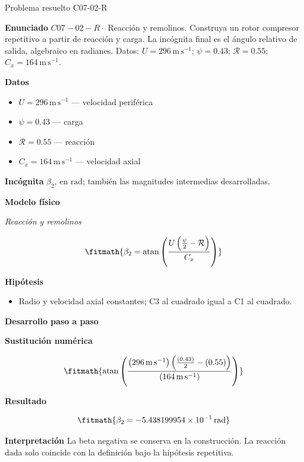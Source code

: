 \documentclass[10pt,openany]{book}
\begin{document}
\begin{studiumworked}{Problema resuelto C07-02-R}


\noindent\textbf{Enunciado}
\(C07-02-R \cdot\) Reacción y remolinos. Construya un rotor compresor repetitivo a partir de reacción y carga. La incógnita final es el ángulo relativo de salida, algebraico en radianes. Datos: \(U=296\, \mathrm{m}\,\mathrm{s}^{-1}\); \(\psi=0.43\); \(\mathcal R=0.55\); \(C_x=164\, \mathrm{m}\,\mathrm{s}^{-1}\).

\noindent\textbf{Datos}
\begin{itemize}
\item $U = 296\,\mathrm{m}\,\mathrm{s}^{-1}$ — velocidad periférica
\item $\psi = 0.43$ — carga
\item $\mathcal R = 0.55$ — reacción
\item $C_x = 164\,\mathrm{m}\,\mathrm{s}^{-1}$ — velocidad axial
\end{itemize}

\noindent\textbf{Incógnita}
$\beta_2$, en $\mathrm{rad}$; también las magnitudes intermedias desarrolladas.

\noindent\textbf{Modelo físico}

\noindent\textit{Reacción y remolinos}

\[
\fitmath{\beta_2=\operatorname{atan}{\left(\frac{U \left(\frac{\psi}{2} - \mathcal R\right)}{C_x} \right)}}
\]

\noindent\textbf{Hipótesis}
\begin{itemize}
\item Radio y velocidad axial constantes; C3 al cuadrado igual a C1 al cuadrado.
\end{itemize}

\noindent\textbf{Desarrollo paso a paso}



\noindent\textbf{Sustitución numérica}

\[
\fitmath{\operatorname{atan}{\left(\frac{\left(296\,\mathrm{m}\,\mathrm{s}^{-1}\right) \left(\frac{\left(0.43\right)}{2} - \left(0.55\right)\right)}{\left(164\,\mathrm{m}\,\mathrm{s}^{-1}\right)} \right)}}
\]

\noindent\textbf{Resultado}

\[
\fitmath{\beta_2=-5.438199954\times10^{-1}\,\mathrm{rad}}
\]

\noindent\textbf{Interpretación}
La beta negativa se conserva en la construcción. La reacción dada solo coincide con la definición bajo la hipótesis repetitiva.


\end{studiumworked}
\end{document}
